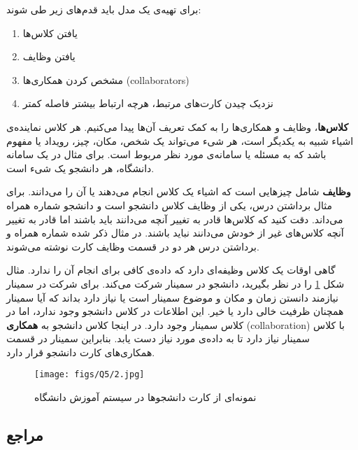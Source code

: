 {\newpage

برای تهیه‌ی یک مدل
باید قدم‌های زیر طی شوند:

\begin{enumerate}
	\item یافتن کلاس‌ها
	\item یافتن وظایف
	\item  مشخص کردن همکاری‌ها (collaborators)
	\item نزدیک‌ چیدن کارت‌های مرتبط، هرچه ارتباط بیشتر فاصله کمتر
\end{enumerate}

\textbf{کلاس‌ها}، وظایف و همکاری‌ها را به کمک تعریف آن‌ها پیدا می‌کنیم.
هر کلاس نماینده‌ی اشیاء شبیه به یکدیگر است، هر شی‌ء می‌تواند یک شخص، مکان، چیز، رویداد یا مفهوم باشد که به مسئله یا سامانه‌ی مورد نظر مربوط است. برای مثال در یک سامانه دانشگاه، هر دانشجو یک شیء است.

\textbf{وظایف} شامل چیز‌هایی است که اشیاء یک کلاس انجام می‌دهند یا آن را می‌دانند. برای مثال برداشتن درس، یکی از وظایف کلاس دانشجو است و دانشجو شماره همراه می‌داند. دقت کنید که کلاس‌ها قادر به تغییر آنچه می‌دانند باید باشند اما قادر به تغییر آنچه کلاس‌های غیر از خودش می‌دانند نباید باشند. در مثال ذکر شده شماره همراه و برداشتن درس هر دو در قسمت وظایف کارت 
نوشته می‌شوند.

گاهی اوقات یک کلاس وظیفه‌ای دارد که داده‌ی کافی برای انجام آن را ندارد. مثال شکل \ref{farzamfig2} را در نظر بگیرید، دانشجو در سمینار شرکت می‌کند. برای شرکت در سمینار نیازمند دانستن زمان و مکان و موضوع سمینار است یا نیاز دارد بداند که آیا سمینار همچنان ظرفیت خالی دارد یا خیر. این اطلاعات در کلاس دانشجو وجود ندارد، اما در کلاس سمینار وجود دارد. در اینجا کلاس دانشجو به \textbf{همکاری} (collaboration) با کلاس سمینار نیاز دارد تا به داده‌ی مورد نیاز دست یابد. بنابراین سمینار در قسمت همکاری‌های کارت
دانشجو قرار دارد.



\begin{figure}
	\centering
	\texttt{[image: figs/Q5/2.jpg]}
	\caption{نمونه‌ای از کارت
		دانشجو‌ها در سیستم آموزش دانشگاه
		\cite{ambler}
	}	
	\label{farzamfig2}
\end{figure}


\subsection*{مراجع}

\begin{latin}
	\begingroup
	\renewcommand{\section}[2]{}%
	

\end{latin}}
